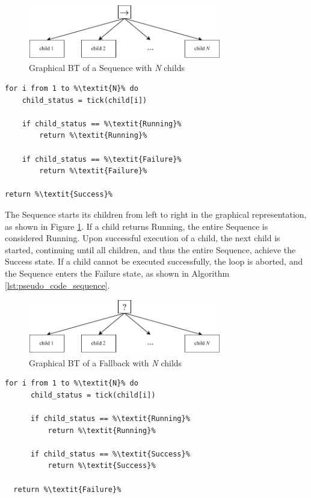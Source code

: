 \begin{figure}[h]
    \centering
    \includegraphics[width=0.75\textwidth]{figures/20_state_of_the_art/sequence.pdf}
    \caption{Graphical BT of a Sequence with \textit{N} childs}
    \label{fig:sequence}
\end{figure}

\begin{lstlisting}[float=h]
for i from 1 to %\textit{N}% do
    child_status = tick(child[i])
    
    if child_status == %\textit{Running}%
        return %\textit{Running}%
        
    if child_status == %\textit{Failure}%
        return %\textit{Failure}%

return %\textit{Success}%
\end{lstlisting}

The Sequence starts its children from left to right in the graphical representation, as shown in Figure \ref{fig:sequence}. If a child returns Running, the entire Sequence is considered Running. Upon successful execution of a child, the next child is started, continuing until all children, and thus the entire Sequence, achieve the Success state. If a child cannot be executed successfully, the loop is aborted, and the Sequence enters the Failure state, as shown in Algorithm \ref{lst:pseudo_code_sequence}.
  

\begin{figure}[h]
    \centering
    \includegraphics[width=0.75\textwidth]{figures/20_state_of_the_art/fallback.pdf}
    \caption{Graphical BT of a Fallback with \textit{N} childs}
    \label{fig:fallback}
  \end{figure}
  
  \begin{lstlisting}[float=h]
  for i from 1 to %\textit{N}% do
      child_status = tick(child[i])
      
      if child_status == %\textit{Running}%
          return %\textit{Running}%
          
      if child_status == %\textit{Success}%
          return %\textit{Success}%
  
  return %\textit{Failure}%
  \end{lstlisting}

